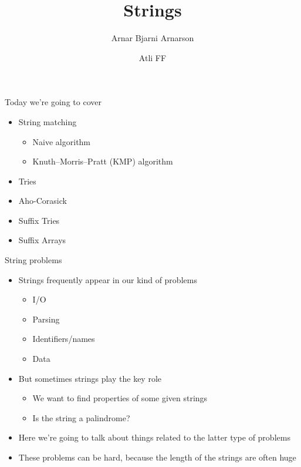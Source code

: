 \documentclass{beamer}
\title{Strings}
\author{Arnar Bjarni Arnarson \and Atli FF}
\institute{\href{http://ru.is/td}{School of Computer Science} \\[2pt] \href{http://ru.is}{Reykjavík University}}
\begin{document}
\maketitle

\begin{frame}[plain]{Today we're going to cover}
    \begin{itemize}
        \item String matching
        \begin{itemize}
            \item Naive algorithm
            \item Knuth--Morris--Pratt (KMP) algorithm
        \end{itemize}
        \item Tries
        \item Aho-Corasick
        \item Suffix Tries
        \item Suffix Arrays
    \end{itemize}
\end{frame}

\begin{frame}[plain]{String problems}
    \begin{itemize}
        \item Strings frequently appear in our kind of problems
        \begin{itemize}
            \item I/O
            \item Parsing
            \item Identifiers/names
            \item Data
        \end{itemize}
        \vspace{5pt}
        \item But sometimes strings play the key role
        \begin{itemize}
            \item We want to find properties of some given strings
            \item Is the string a palindrome?
        \end{itemize}
        \vspace{5pt}
        \item Here we're going to talk about things related to the latter type of problems
        \vspace{5pt}
        \item These problems can be hard, because the length of the strings are often huge
    \end{itemize}
\end{frame}
\end{document}
